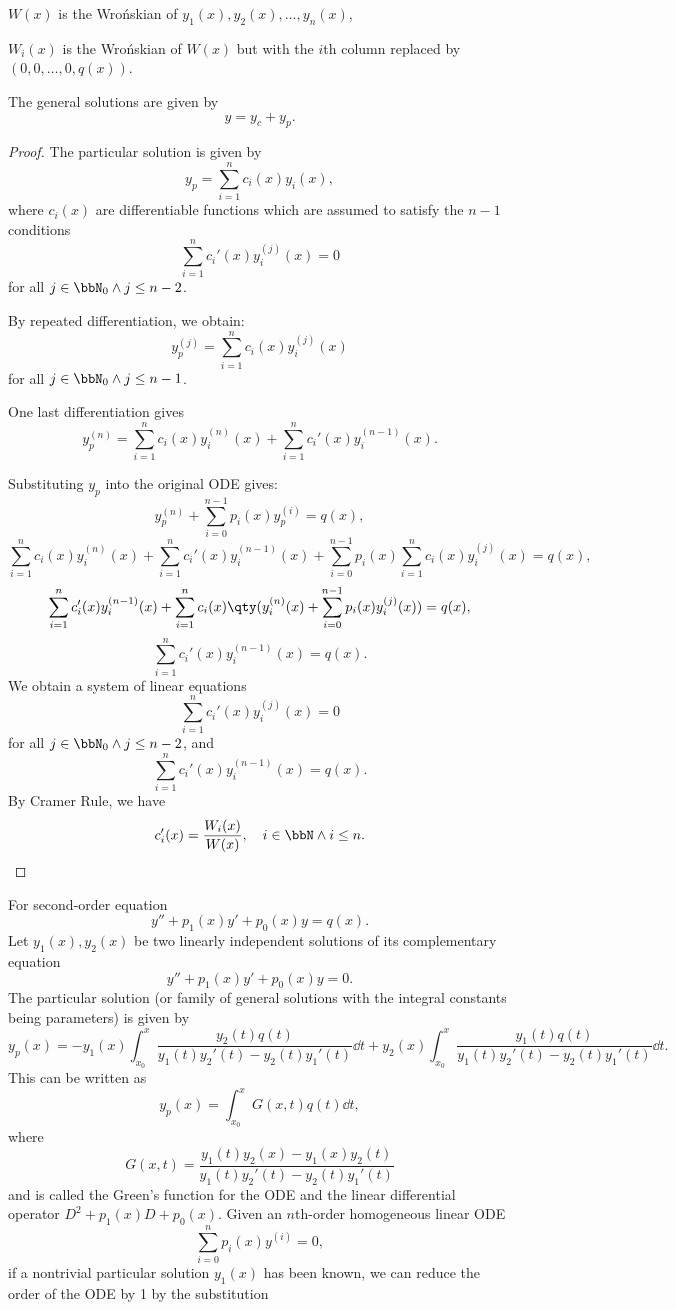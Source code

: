 \documentclass[a4paper,12pt]{report}
\begin{document}
\item $W(x)$ is the Wrońskian of $y_1(x),y_2(x),\ldots,y_n(x)$,
\item $W_i(x)$ is the Wrońskian of $W(x)$ but with the $i$th column replaced by $(0,0,\ldots,0,q(x))$.
\eit
\item The general solutions are given by
\[y=y_c+y_p.\]
\een
\begin{proof}
The particular solution is given by
\[y_p=\sum_{i=1}^nc_i(x)y_i(x),\]
where $c_i(x)$ are differentiable functions which are assumed to satisfy the $n-1$ conditions
\[\sum_{i=1}^nc_i'(x)y_i^{(j)}(x)=0\]
for all $j\in\bbN_0\land j\leq n-2$.

By repeated differentiation, we obtain:
\[y_p^{(j)}=\sum_{i=1}^nc_i(x)y_i^{(j)}(x)\]
for all $j\in\bbN_0\land j\leq n-1$.

One last differentiation gives
\[y_p^{(n)}=\sum_{i=1}^nc_i(x)y_i^{(n)}(x)+\sum_{i=1}^nc_i'(x)y_i^{(n-1)}(x).\]

Substituting $y_p$ into the original ODE gives:
\[y_p^{(n)}+\sum_{i=0}^{n-1}p_i(x)y_p^{(i)}=q(x),\]
\[\sum_{i=1}^nc_i(x)y_i^{(n)}(x)+\sum_{i=1}^nc_i'(x)y_i^{(n-1)}(x)+\sum_{i=0}^{n-1}p_i(x)\sum_{i=1}^nc_i(x)y_i^{(j)}(x)=q(x),\]
\[\sum_{i=1}^nc_i'(x)y_i^{(n-1)}(x)+\sum_{i=1}^nc_i(x)\qty(y_i^{(n)}(x)+\sum_{i=0}^{n-1}p_i(x)y_i^{(j)}(x))=q(x),\]
\[\sum_{i=1}^nc_i'(x)y_i^{(n-1)}(x)=q(x).\]
We obtain a system of linear equations
\[\sum_{i=1}^nc_i'(x)y_i^{(j)}(x)=0\]
for all $j\in\bbN_0\land j\leq n-2$, and
\[\sum_{i=1}^nc_i'(x)y_i^{(n-1)}(x)=q(x).\]
By Cramer Rule, we have
\[c_i'(x)=\frac{W_i(x)}{W(x)},\quad i\in\bbN\land i\leq n.\]
\end{proof}
For second-order equation
\[y''+p_1(x)y'+p_0(x)y=q(x).\]
Let $y_1(x),y_2(x)$ be two linearly independent solutions of its complementary equation
\[y''+p_1(x)y'+p_0(x)y=0.\]
The particular solution (or family of general solutions with the integral constants being parameters) is given by
\[y_p(x)=-y_1(x)\int_{x_0}^x\frac{y_2(t)q(t)}{y_1(t)y_2'(t)-y_2(t)y_1'(t)}\dd{t}+y_2(x)\int_{x_0}^x\frac{y_1(t)q(t)}{y_1(t)y_2'(t)-y_2(t)y_1'(t)}\dd{t}.\]
This can be written as
\[y_p(x)=\int_{x_0}^xG(x,t)q(t)\dd{t},\]
where
\[G(x,t)=\frac{y_1(t)y_2(x)-y_1(x)y_2(t)}{y_1(t)y_2'(t)-y_2(t)y_1'(t)}\]
and is called the Green's function for the ODE and the linear differential operator $D^2+p_1(x)D+p_0(x)$.
Given an $n$th-order homogeneous linear ODE
\[\sum_{i=0}^np_i(x)y^{(i)}=0,\]
if a nontrivial particular solution $y_1(x)$ has been known, we can reduce the order of the ODE by 1 by the substitution
\end{document}
